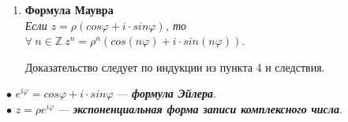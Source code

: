 \begin{enumerate}
\begin{Proof}
		Доказательство проводится по аналогии с предыдущим пунктом.
	\end{Proof}
	\newtheorem*{cor6_3_1}{Следствие}\begin{cor6_3_1} $z^{-1} = \dfrac{1}{z} = \dfrac{1(cos\varphi + i\cdot sin\varphi)}{\rho(cos\varphi + i\cdot sin\varphi)} = \dfrac{1}{\rho}(cos(-\varphi) + i\cdot sin(\varphi))$.
	\end{cor6_3_1}
	\item \textbf{Формула Маувра}\\
	\textit{Если $z = \rho(cos\varphi + i\cdot sin\varphi)$, то $\forall\ n \in \mathbb{Z}\ z^n = \rho^n(cos(n\varphi) + i\cdot sin(n\varphi))$}.\begin{Proof}
		Доказательство следует по индукции из пункта 4 и следствия.
	\end{Proof}
\end{enumerate}
$\bullet$ $e^{i\varphi}=cos\varphi + i\cdot sin\varphi$ --- \textit{\textbf{формула Эйлера}}.\\
$\bullet$ $z = \rho e^{i\varphi}$ ---\textit{ \textbf{экспоненциальная форма записи комплексного числа}}.





